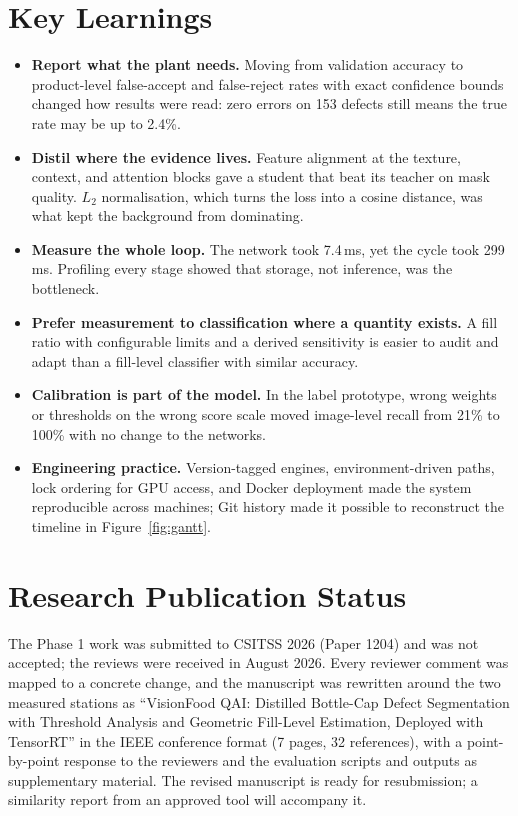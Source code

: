 \section{Key Learnings}
\label{sec:key-learnings}

\begin{itemize}
    \item \textbf{Report what the plant needs.} Moving from validation accuracy to product-level false-accept and false-reject rates with exact confidence bounds changed how results were read: zero errors on 153 defects still means the true rate may be up to 2.4\%.
    \item \textbf{Distil where the evidence lives.} Feature alignment at the texture, context, and attention blocks gave a student that beat its teacher on mask quality. $L_2$ normalisation, which turns the loss into a cosine distance, was what kept the background from dominating.
    \item \textbf{Measure the whole loop.} The network took 7.4\,ms, yet the cycle took 299\,ms. Profiling every stage showed that storage, not inference, was the bottleneck.
    \item \textbf{Prefer measurement to classification where a quantity exists.} A fill ratio with configurable limits and a derived sensitivity is easier to audit and adapt than a fill-level classifier with similar accuracy.
    \item \textbf{Calibration is part of the model.} In the label prototype, wrong weights or thresholds on the wrong score scale moved image-level recall from 21\% to 100\% with no change to the networks.
    \item \textbf{Engineering practice.} Version-tagged engines, environment-driven paths, lock ordering for GPU access, and Docker deployment made the system reproducible across machines; Git history made it possible to reconstruct the timeline in Figure~\ref{fig:gantt}.
\end{itemize}

\section{Research Publication Status}
\label{sec:publication}
The Phase 1 work was submitted to CSITSS 2026 (Paper 1204) and was not accepted; the reviews were received in August 2026. Every reviewer comment was mapped to a concrete change, and the manuscript was rewritten around the two measured stations as ``VisionFood QAI: Distilled Bottle-Cap Defect Segmentation with Threshold Analysis and Geometric Fill-Level Estimation, Deployed with TensorRT'' in the IEEE conference format (7 pages, 32 references), with a point-by-point response to the reviewers and the evaluation scripts and outputs as supplementary material. The revised manuscript is ready for resubmission; a similarity report from an approved tool will accompany it.

